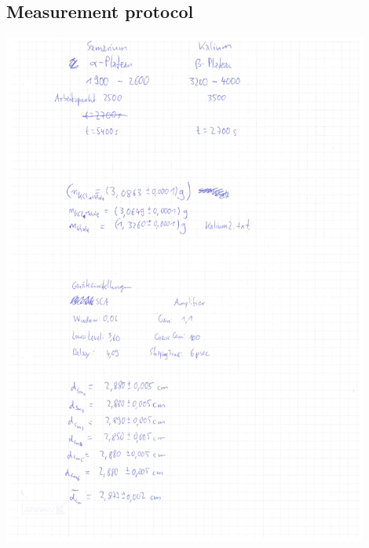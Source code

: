 \documentclass[12pt]{article}
\begin{document}

\subsection{Measurement protocol}\label{laborbuch}
\begin{minipage}{\textwidth}
	\centering
	\includegraphics[width=0.9\textwidth]{figures/Laborbuch-1.pdf}
\end{minipage}
\end{document}
